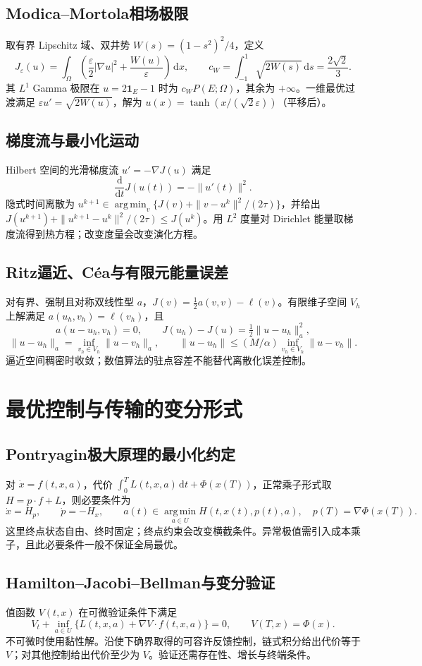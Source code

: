 \documentclass[../main.tex]{subfiles}
\begin{document}
\subsection{Modica--Mortola相场极限}
取有界 Lipschitz 域、双井势 $W(s)=(1-s^2)^2/4$，定义
\[
J_\varepsilon(u)=\int_\Omega\left(\frac\varepsilon2|\nabla u|^2+\frac{W(u)}\varepsilon\right)\,\mathrm dx,
\qquad c_W=\int_{-1}^1\sqrt{2W(s)}\,\mathrm ds=\frac{2\sqrt2}{3}.
\]
其 $L^1$ Gamma 极限在 $u=2\bm1_E-1$ 时为 $c_WP(E;\Omega)$，其余为 $+\infty$。一维最优过渡满足 $\varepsilon u'=\sqrt{2W(u)}$，解为 $u(x)=\tanh(x/(\sqrt2\varepsilon))$（平移后）。
\subsection{梯度流与最小化运动}
Hilbert 空间的光滑梯度流 $u'=-\nabla J(u)$ 满足
\[
\frac{\mathrm d}{\mathrm dt}J(u(t))=-\|u'(t)\|^2.
\]
隐式时间离散为 $u^{k+1}\in\operatorname*{arg\,min}_v\{J(v)+\|v-u^k\|^2/(2\tau)\}$，并给出 $J(u^{k+1})+\|u^{k+1}-u^k\|^2/(2\tau)\le J(u^k)$。用 $L^2$ 度量对 Dirichlet 能量取梯度流得到热方程；改变度量会改变演化方程。
\subsection{Ritz逼近、Céa与有限元能量误差}
对有界、强制且对称双线性型 $a$，$J(v)=\tfrac12a(v,v)-\ell(v)$。有限维子空间 $V_h$ 上解满足 $a(u_h,v_h)=\ell(v_h)$，且
\[
a(u-u_h,v_h)=0,\qquad
J(u_h)-J(u)=\tfrac12\|u-u_h\|_a^2,
\]
\[
\|u-u_h\|_a=\inf_{v_h\in V_h}\|u-v_h\|_a,\qquad
\|u-u_h\|\le(M/\alpha)\inf_{v_h\in V_h}\|u-v_h\|.
\]
逼近空间稠密时收敛；数值算法的驻点容差不能替代离散化误差控制。
\section{最优控制与传输的变分形式}
\subsection{Pontryagin极大原理的最小化约定}
对 $\dot x=f(t,x,a)$，代价 $\int_0^TL(t,x,a)\,\mathrm dt+\Phi(x(T))$，正常乘子形式取 $H=p\cdot f+L$，则必要条件为
\[
\dot x=H_p,\qquad\dot p=-H_x,\qquad
a(t)\in\operatorname*{arg\,min}_{a\in U}H(t,x(t),p(t),a),\quad p(T)=\nabla\Phi(x(T)).
\]
这里终点状态自由、终时固定；终点约束会改变横截条件。异常极值需引入成本乘子，且此必要条件一般不保证全局最优。
\subsection{Hamilton--Jacobi--Bellman与变分验证}
值函数 $V(t,x)$ 在可微验证条件下满足
\[
V_t+\inf_{a\in U}\{L(t,x,a)+\nabla V\cdot f(t,x,a)\}=0,\qquad V(T,x)=\Phi(x).
\]
不可微时使用黏性解。沿使下确界取得的可容许反馈控制，链式积分给出代价等于 $V$；对其他控制给出代价至少为 $V$。验证还需存在性、增长与终端条件。
\end{document}
